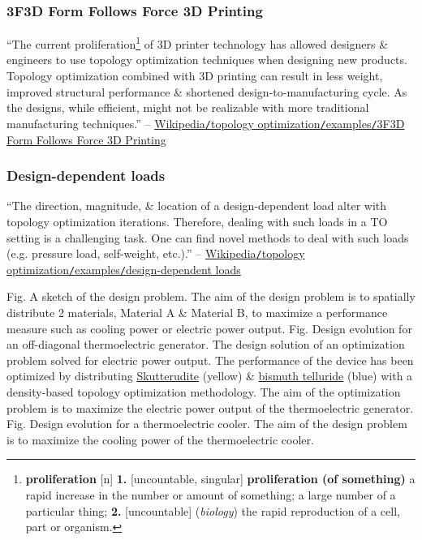 \documentclass[oneside]{book}
\numberwithin{equation}{section}
\begin{document}
\subsubsection{3F3D Form Follows Force 3D Printing}
``The current proliferation\footnote{\textbf{proliferation} [n] \textbf{1.} [uncountable, singular] \textbf{proliferation (of something)} a rapid increase in the number or amount of something; a large number of a particular thing; \textbf{2.} [uncountable] (\textit{biology}) the rapid reproduction of a cell, part or organism.} of 3D printer technology has allowed designers \& engineers to use topology optimization techniques when designing new products. Topology optimization combined with 3D printing can result in less weight, improved structural performance \& shortened design-to-manufacturing cycle. As the designs, while efficient, might not be realizable with more traditional manufacturing techniques.'' -- \href{https://en.wikipedia.org/wiki/Topology_optimization#3F3D_Form_Follows_Force_3D_Printing}{Wikipedia\texttt{/}topology optimization\texttt{/}examples\texttt{/}3F3D Form Follows Force 3D Printing}

\subsubsection{Design-dependent loads}
``The direction, magnitude, \& location of a design-dependent load alter with topology optimization iterations. Therefore, dealing with such loads in a TO setting is a challenging task. One can find novel methods to deal with such loads (e.g. pressure load, self-weight, etc.).'' -- \href{https://en.wikipedia.org/wiki/Topology_optimization#Design-dependent_loads}{Wikipedia\texttt{/}topology optimization\texttt{/}examples\texttt{/}design-dependent loads}

\textsf{Fig. A sketch of the design problem. The aim of the design problem is to spatially distribute 2 materials, Material A \& Material B, to maximize a performance measure such as cooling power or electric power output.} \textsf{Fig. Design evolution for an off-diagonal thermoelectric generator. The design solution of an optimization problem solved for electric power output. The performance of the device has been optimized by distributing \href{https://en.wikipedia.org/wiki/Skutterudite}{Skutterudite} (yellow) \& \href{https://en.wikipedia.org/wiki/Bismuth_telluride}{bismuth telluride} (blue) with a density-based topology optimization methodology. The aim of the optimization problem is to maximize the electric power output of the thermoelectric generator.} \textsf{Fig. Design evolution for a thermoelectric cooler. The aim of the design problem is to maximize the cooling power of the thermoelectric cooler.}
\end{document}
